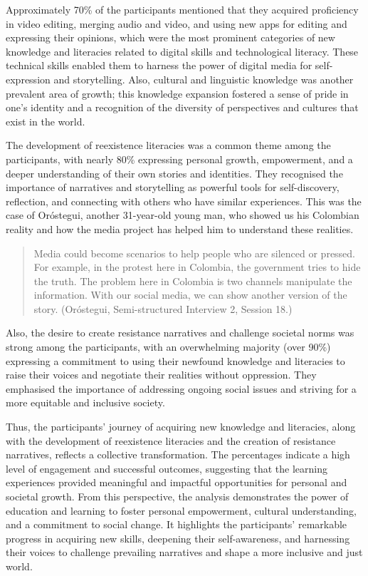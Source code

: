 \documentclass[english]{textolivre}
\begin{document}
Approximately 70\% of the participants mentioned that they acquired proficiency in video editing, merging audio and video, and using new apps for editing and expressing their opinions, which were the most prominent categories of new knowledge and literacies related to digital skills and technological literacy. These technical skills enabled them to harness the power of digital media for self-expression and storytelling. Also, cultural and linguistic knowledge was another prevalent area of growth; this knowledge expansion fostered a sense of pride in one's identity and a recognition of the diversity of perspectives and cultures that exist in the world.

The development of reexistence literacies was a common theme among the participants, with nearly 80\% expressing personal growth, empowerment, and a deeper understanding of their own stories and identities. They recognised the importance of narratives and storytelling as powerful tools for self-discovery, reflection, and connecting with others who have similar experiences. This was the case of Oróstegui, another 31-year-old young man, who showed us his Colombian reality and how the media project has helped him to understand these realities.

\begin{quote}
    Media could become scenarios to help people who are silenced or pressed. For example, in the protest here in Colombia, the government tries to hide the truth. The problem here in Colombia is two channels manipulate the information. With our social media, we can show another version of the story. (Oróstegui, Semi-structured Interview 2, Session 18.)
\end{quote}

Also, the desire to create resistance narratives and challenge societal norms was strong among the participants, with an overwhelming majority (over 90\%) expressing a commitment to using their newfound knowledge and literacies to raise their voices and negotiate their realities without oppression. They emphasised the importance of addressing ongoing social issues and striving for a more equitable and inclusive society.

Thus, the participants' journey of acquiring new knowledge and literacies, along with the development of reexistence literacies and the creation of resistance narratives, reflects a collective transformation. The percentages indicate a high level of engagement and successful outcomes, suggesting that the learning experiences provided meaningful and impactful opportunities for personal and societal growth. From this perspective, the analysis demonstrates the power of education and learning to foster personal empowerment, cultural understanding, and a commitment to social change. It highlights the participants' remarkable progress in acquiring new skills, deepening their self-awareness, and harnessing their voices to challenge prevailing narratives and shape a more inclusive and just world.
\end{document}
